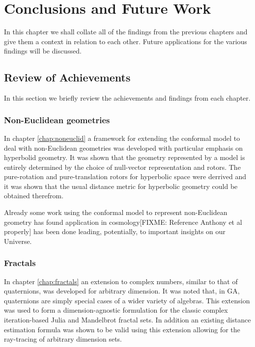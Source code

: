 \chapter{Conclusions and Future Work}

In this chapter we shall collate all of the findings from the previous chapters
and give them a context in relation to each other. Future applications for
the various findings will be discussed.

\section{Review of Achievements}

In this section we briefly review the achievements and findings from each
chapter.

\subsection{Non-Euclidean geometries}

In chapter \ref{chap:noneuclid} a framework for extending the conformal
model to deal with non-Euclidean geometries was developed with particular
emphasis on hyperbolid geometry. It was shown that the geometry
represented by a model is entirely determined by the choice of null-vector
representation and rotors. The pure-rotation and pure-translation 
rotors for hyperbolic space were derrived and it was shown that the usual
distance metric for hyperbolic geometry could be obtained therefrom.

Already some work using the conformal model to represent non-Euclidean geometry
has found application in cosmology\cite{GA:SIGKEY}[FIXME: Reference Anthony 
et al properly] has been done leading, potentially, to important insights on
our Universe.

\subsection{Fractals}

In chapter \ref{chap:fractals} an extension to complex numbers, similar to that
of quaternions, was developed for arbitrary dimension. It was noted that, in
GA, quaternions are simply special cases of a wider variety of algebras. This
extension was used to form a dimension-agnostic formulation for the classic
complex iteration-based Julia and Mandelbrot fractal sets. In addition an
existing distance estimation formula was shown to be valid using this extension
allowing for the ray-tracing of arbitrary dimension sets.


